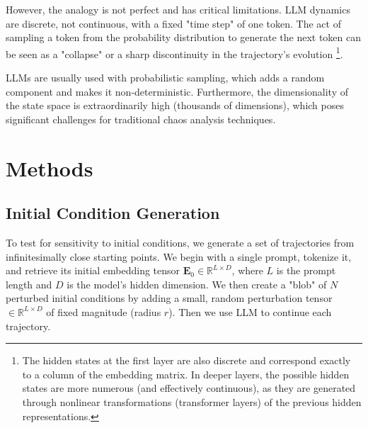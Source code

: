 \documentclass[a4paper,12pt]{article}
\begin{document}
However, the analogy is not perfect and has critical limitations. LLM dynamics are discrete, not continuous, with a fixed "time step" of one token. The act of sampling a token from the probability distribution to generate the next token can be seen as a "collapse" or a sharp discontinuity in the trajectory's evolution \footnote{The hidden states at the first layer are also discrete and correspond exactly to a column of the embedding matrix. In deeper layers, the possible hidden states are more numerous (and effectively continuous), as they are generated through nonlinear transformations (transformer layers) of the previous hidden representations.}.

LLMs are usually used with probabilistic sampling, which adds a random component and makes it non-deterministic. Furthermore, the dimensionality of the state space is extraordinarily high (thousands of dimensions), which poses significant challenges for traditional chaos analysis techniques.




\section{Methods}

\subsection{Initial Condition Generation}
To test for sensitivity to initial conditions, we generate a set of trajectories from infinitesimally close starting points. We begin with a single prompt, tokenize it, and retrieve its initial embedding tensor $\mathbf{E}_0 \in \mathbb{R}^{L \times D}$, where $L$ is the prompt length and $D$ is the model's hidden dimension. We then create a "blob" of $N$ perturbed initial conditions by adding a small, random perturbation tensor $\in \mathbb{R}^{L \times D}$ of fixed magnitude (radius $r$). Then we use LLM to continue each trajectory.
\end{document}
